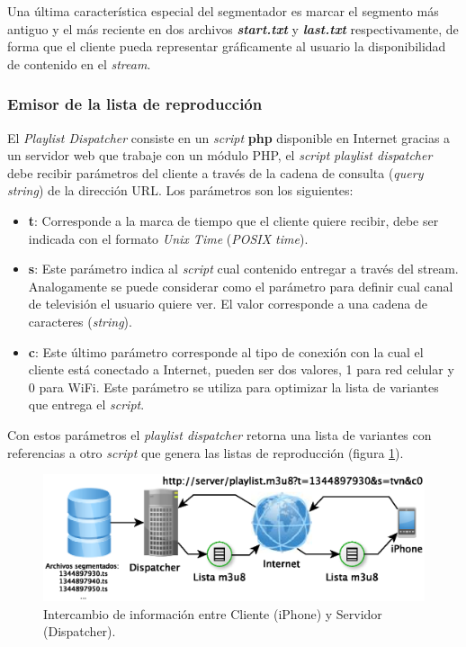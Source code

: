 Una última característica especial del segmentador es marcar el segmento más antiguo y el más reciente en dos archivos \textbf{\textit{start.txt}} y \textbf{\textit{last.txt}} respectivamente, de forma que el cliente pueda representar gráficamente al usuario la disponibilidad de contenido en el \textit{stream}.
		
		\subsubsection{Emisor de la lista de reproducción}
El \textit{Playlist Dispatcher} consiste en un \textit{script} \textbf{php} disponible en Internet gracias a un servidor web que trabaje con un módulo PHP, el \textit{script} \textit{playlist dispatcher} debe recibir parámetros del cliente a través de la cadena de consulta (\textit{query string}) de la dirección URL. Los parámetros son los siguientes:

\begin{itemize}
	\item \textbf{t}: Corresponde a la marca de tiempo que el cliente quiere recibir, debe ser indicada con el formato \textit{Unix Time} (\textit{POSIX time}).
	\item \textbf{s}: Este parámetro indica al \textit{script} cual contenido entregar a través del stream. Analogamente se puede considerar como el parámetro para definir cual canal de televisión el usuario quiere ver. El valor corresponde a una cadena de caracteres (\textit{string}).
	\item \textbf{c}: Este último parámetro corresponde al tipo de conexión con la cual el cliente está conectado a Internet, pueden ser dos valores, 1 para red celular y 0 para WiFi. Este parámetro se utiliza para optimizar la lista de variantes que entrega el \textit{script}.
\end{itemize}
		
Con estos parámetros el \textit{playlist dispatcher} retorna una lista de variantes con referencias a otro \textit{script} que genera las listas de reproducción (figura \ref{diagramaHLSAltaVoz}).


	\begin{figure}[H]
		\centering
		\includegraphics[scale=0.8]{imgs/diagrama-HLS-AltaVoz.eps}
		\caption{Intercambio de información entre Cliente (iPhone) y Servidor (Dispatcher).}
		\label{diagramaHLSAltaVoz}
	\end{figure}		
		
